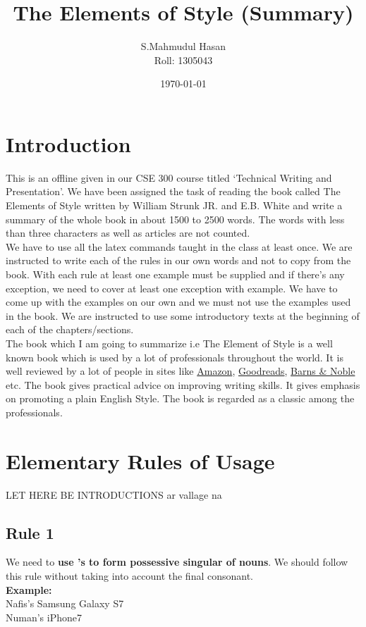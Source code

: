 \documentclass{report}
\begin{document}
\title{The Elements of Style (Summary)}
\author{S.Mahmudul Hasan\\Roll: 1305043}
\date{\today}%
\maketitle
\tableofcontents


\chapter{Introduction}
\raggedright  %
This is an offline given in our CSE 300 course titled `Technical Writing and Presentation'. We have been assigned the task of reading the book called The Elements of Style written by William Strunk JR. and E.B. White and write a summary of the whole book in about 1500 to 2500 words. The words with less than three characters as well as articles are not counted.\\
We have to use all the latex commands taught in the class at least once. We are instructed to write each of the rules in our own words and not to copy from the book. With each rule at least one example must be supplied and if there's any exception, we need to cover at least one exception with example. We have to come up with the examples on our own and we must not use the examples used in the book. We are instructed to use some introductory texts at the beginning of each of the chapters/sections.\\
The book which I am going to summarize i.e The Element of Style is a well known book which is used by a lot of professionals throughout the world. It is well reviewed by a lot of people in sites like \href{https://www.amazon.com/Elements-Style-William-Strunk-Jr/dp/1557427283}{Amazon}, \href{http://www.goodreads.com/book/show/33514.The_Elements_of_Style}{Goodreads}, \href{http://www.barnesandnoble.com/w/the-elements-of-style-william-strunk/1116794279}{Barns \& Noble} etc.
The book gives practical advice on improving writing skills. It gives emphasis on promoting a plain English Style. The book is regarded as a classic among the professionals.

\chapter{Elementary Rules of Usage}
\raggedright
LET HERE BE INTRODUCTIONS ar vallage na 

\section{Rule 1}
We need to \textbf{use 's to form possessive singular of nouns}. We should follow this rule without taking into account the final consonant.\\
\textbf{Example:}\\
Nafis's Samsung Galaxy S7\\
Numan's iPhone7\\
\end{document}

